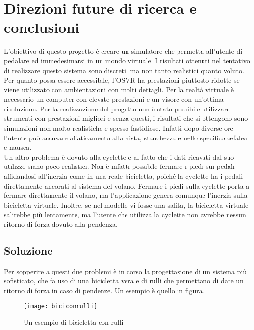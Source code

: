 \chapter{Direzioni future di ricerca e conclusioni}
\label{conclusioni}
\thispagestyle{empty}


\noindent 
L'obiettivo di questo progetto è creare un simulatore che permetta all'utente di pedalare ed immedesimarsi in un mondo virtuale. I risultati ottenuti nel tentativo di realizzare questo sistema sono discreti, ma non tanto realistici quanto voluto.
Per quanto possa essere accessibile, l'OSVR ha prestazioni piuttosto ridotte se viene utilizzato con ambientazioni con molti dettagli. Per la realtà virtuale è necessario un computer con elevate prestazioni e un visore con un'ottima risoluzione. Per la realizzazione del progetto non è stato possibile utilizzare strumenti con prestazioni migliori e senza questi, i risultati che si ottengono sono simulazioni non molto realistiche e spesso fastidiose. Infatti dopo diverse ore l'utente può accusare affaticamento alla vista, stanchezza e nello specifico cefalea e nausea.\\
Un altro problema è dovuto alla cyclette e al fatto che i dati ricavati dal suo utilizzo siano poco realistici. Non è infatti possibile fermare i piedi sui pedali affidandosi all'inerzia come in una reale bicicletta, poiché la cyclette ha i pedali direttamente ancorati al sistema del volano. Fermare i piedi sulla cyclette porta a fermare direttamente il volano, ma l'applicazione genera comunque l'inerzia sulla bicicletta virtuale. Inoltre, se nel modello vi fosse una salita, la bicicletta virtuale salirebbe più lentamente, ma l'utente che utilizza la cyclette non avrebbe nessun ritorno di forza dovuto alla pendenza.

\section{Soluzione}
Per sopperire a questi due problemi è in corso la progettazione di un sistema più sofisticato, che fa uso di una bicicletta vera e di rulli che permettano di dare un ritorno di forza in caso di pendenze. Un esempio è quello in figura.
 \begin{figure}[htb]
    \centering
    \texttt{[image: biciconrulli]}
    \caption{Un esempio di bicicletta con rulli\label{fig:biciconrulli}}
\end{figure}

